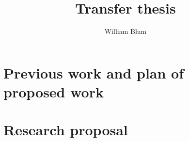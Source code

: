 \documentclass[nocenter,sfbold]{thesis}
\author{William Blum}
\title{Transfer thesis}
\begin{document}
\maketitle \tableofcontents

\part{Previous work and plan of proposed work}




\part{Research proposal}











         {\protect{}}
\end{document}
